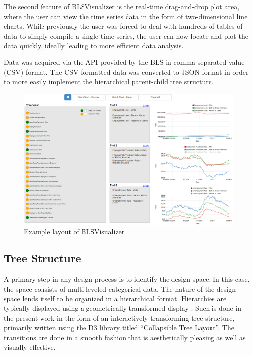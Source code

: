 \documentclass{sigchi}
\begin{document}
The second feature of BLSVisualizer is the real-time drag-and-drop plot area, where the user can view the time series data in the form of two-dimensional line charts. While previously the user was forced to deal with hundreds of tables of data to simply compile a single time series, the user can now locate and plot the data quickly, ideally leading to more efficient data analysis.

Data was acquired via the API provided by the BLS in comma separated value (CSV) format. The CSV formatted data was converted to JSON format in order to more easily implement the hierarchical parent-child tree structure.

\begin{figure}[t]
\centering
    \includegraphics[width = 6.2in]{figures/BLSVisualizer.png}
    \caption{Example layout of BLSVisualizer }
    \label{BLSVLayout}
\end{figure}


\subsection{Tree Structure}

A primary step in any design process is to identify the design space. In this case, the space consists of multi-leveled categorical data. The nature of the design space lends itself to be organized in a hierarchical format. Hierarchies are typically displayed using a geometrically-transformed display \cite{keim2002information}. Such is done in the present work in the form of an interactively transforming tree structure, primarily written using the D3 library titled ``Collapsible Tree Layout''. The transitions are done in a smooth fashion that is aesthetically pleasing as well as visually effective.
\end{document}
